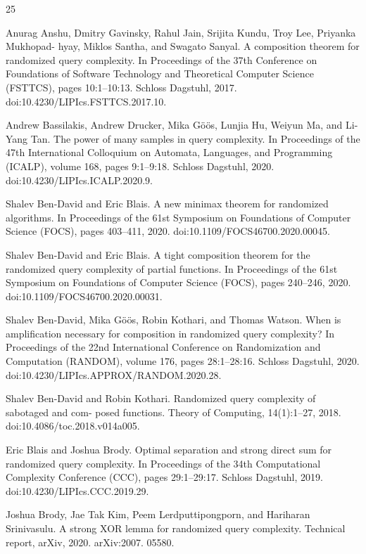 \documentclass[10pt,a4paper]{article}
\begin{document}
\begin{thebibliography}{25}

Anurag Anshu, Dmitry Gavinsky, Rahul Jain, Srijita Kundu, Troy Lee, Priyanka Mukhopad- hyay, Miklos Santha, and Swagato Sanyal. A composition theorem for randomized query complexity. In Proceedings of the 37th Conference on Foundations of Software Technology and Theoretical Computer Science (FSTTCS), pages 10:1–10:13. Schloss Dagstuhl, 2017. doi:10.4230/LIPIcs.FSTTCS.2017.10.

Andrew Bassilakis, Andrew Drucker, Mika Göös, Lunjia Hu, Weiyun Ma, and Li-Yang Tan. The power of many samples in query complexity. In Proceedings of the 47th International Colloquium on Automata, Languages, and Programming (ICALP), volume 168, pages 9:1–9:18. Schloss Dagstuhl, 2020. doi:10.4230/LIPIcs.ICALP.2020.9.

Shalev Ben-David and Eric Blais. A new minimax theorem for randomized algorithms. In Proceedings of the 61st Symposium on Foundations of Computer Science (FOCS), pages 403–411, 2020. doi:10.1109/FOCS46700.2020.00045.

Shalev Ben-David and Eric Blais. A tight composition theorem for the randomized query complexity of partial functions. In Proceedings of the 61st Symposium on Foundations of Computer Science (FOCS), pages 240–246, 2020. doi:10.1109/FOCS46700.2020.00031.

Shalev Ben-David, Mika Göös, Robin Kothari, and Thomas Watson. When is amplification necessary for composition in randomized query complexity? In Proceedings of the 22nd International Conference on Randomization and Computation (RANDOM), volume 176, pages 28:1–28:16. Schloss Dagstuhl, 2020. doi:10.4230/LIPIcs.APPROX/RANDOM.2020.28.

Shalev Ben-David and Robin Kothari. Randomized query complexity of sabotaged and com- posed functions. Theory of Computing, 14(1):1–27, 2018. doi:10.4086/toc.2018.v014a005.

Eric Blais and Joshua Brody. Optimal separation and strong direct sum for randomized query complexity. In Proceedings of the 34th Computational Complexity Conference (CCC), pages 29:1–29:17. Schloss Dagstuhl, 2019. doi:10.4230/LIPIcs.CCC.2019.29.

Joshua Brody, Jae Tak Kim, Peem Lerdputtipongporn, and Hariharan Srinivasulu. A strong XOR lemma for randomized query complexity. Technical report, arXiv, 2020. arXiv:2007. 05580.


\end{thebibliography}
\end{document}
